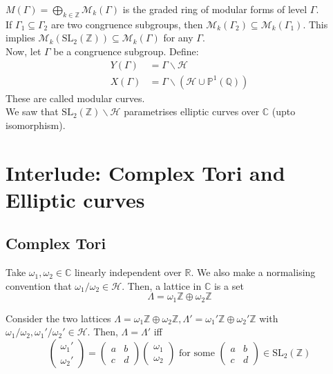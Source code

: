 \documentclass[oneside, 12pt]{scrbook}
\newcommand{\CC}{\mathbb C}
\newcommand{\QQ}{\mathbb Q}
\newcommand{\RR}{\mathbb R}
\newcommand{\ZZ}{\mathbb Z}
\newcommand{\PP}{\mathbb{P}}
\newcommand{\SL}{\mathrm{SL}}
\newcommand{\Hh}{\mathcal{H}}
\newcommand{\Mm}{\mathcal{M}}
\theoremstyle{theorem}
\begin{document}
$M(\Gamma) = \bigoplus_{k \in \ZZ} \Mm_{k}(\Gamma)$ is the graded ring of modular forms of level $\Gamma$. \\

If $\Gamma_{1} \subseteq \Gamma_{2}$ are two congruence subgroups, then $\Mm_{k}(\Gamma_{2}) \subseteq \Mm_{k}(\Gamma_{1})$. This implies $\Mm_{k}(\SL_{2}(\ZZ)) \subseteq \Mm_{k}(\Gamma)$ for any $\Gamma$.\\

Now, let $\Gamma$ be a congruence subgroup. Define: 
\begin{align*}
Y(\Gamma) &= \Gamma \backslash \Hh \\
X(\Gamma) &= \Gamma \backslash (\Hh \cup \PP^1 (\QQ))
\end{align*}
These are called modular curves. \\

We saw that $\SL_{2}(\ZZ) \backslash \Hh$ parametrises elliptic curves over $\CC$ (upto isomorphism).

\section{Interlude: Complex Tori and Elliptic curves}

\subsection{Complex Tori}
\begin{definition}
Take $\omega_{1}, \omega_{2} \in \CC$ linearly independent over $\RR$. We also make a normalising convention that $\omega_{1}/\omega_{2} \in \Hh$. Then, a lattice in $\CC$ is a set $$\Lambda = \omega_{1} \ZZ \oplus \omega_{2} \ZZ$$
\end{definition}

\begin{lemma}
Consider the two lattices $\Lambda = \omega_{1} \ZZ \oplus \omega_{2} \ZZ , \Lambda '= \omega_{1}' \ZZ \oplus \omega_{2}' \ZZ$ with $\omega_{1}/\omega_{2}, \omega_{1}'/\omega_{2}' \in \Hh$. Then, $\Lambda = \Lambda '$ iff $$\begin{pmatrix}
\omega_{1} ' \\ \omega_{2}'
\end{pmatrix} = \begin{pmatrix}
a & b \\ c & d
\end{pmatrix}\begin{pmatrix}
\omega_{1}  \\ \omega_{2}
\end{pmatrix} \text{ for some } \begin{pmatrix}
a & b \\ c & d
\end{pmatrix} \in \SL_{2}(\ZZ)$$
\end{lemma}
\end{document}
